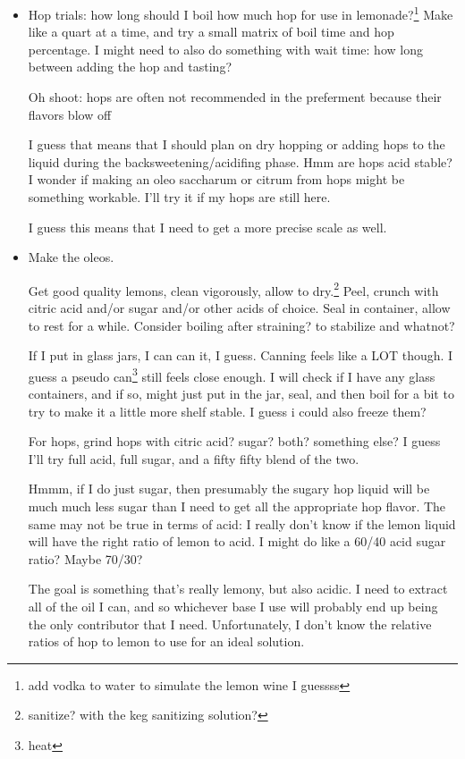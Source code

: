 \documentclass[12pt]{article}
\renewcommand{\,}{\textsuperscript{,}}
\begin{document}
\begin{itemize}

\item Hop trials: how long should I boil how much hop for use in lemonade?\footnote{add vodka to water to simulate the lemon wine I guessss}  
Make like a quart at a time, and try a small matrix of boil time and hop percentage.  
I might need to also do something with wait time: how long between adding the hop and tasting?

Oh shoot: hops are often not recommended in the preferment because their flavors blow off

I guess that means that I should plan on dry hopping or adding hops to the liquid during the backsweetening/acidifing phase.  
Hmm are hops acid stable?  
I wonder if making an oleo saccharum or citrum from hops might be something workable.  
I'll try it if my hops are still here.

I guess this means that I need to get a more precise scale as well.

\item Make the oleos.

Get good quality lemons, clean vigorously, allow to dry.\footnote{sanitize? with the keg sanitizing solution?}  
Peel, crunch with citric acid and/or sugar and/or other acids of choice.  
Seal in container, allow to rest for a while.  
Consider boiling after straining? to stabilize and whatnot?

If I put in glass jars, I can can it, I guess.  
Canning feels like a LOT though.  
I guess a pseudo can\footnote{heat} still feels close enough.  
I will check if I have any glass containers, and if so, might just put in the jar, seal, and then boil for a bit to try to make it a little more shelf stable.  
I guess i could also freeze them?

For hops, grind hops with citric acid? sugar? both? something else? I guess I'll try full acid, full sugar, and a fifty fifty blend of the two.

Hmmm, if I do just sugar, then presumably the sugary hop liquid will be much much less sugar than I need to get all the appropriate hop flavor.  
The same may not be true in terms of acid: I really don't know if the lemon liquid will have the right ratio of lemon to acid. I might do like a 60/40 acid sugar ratio?  
Maybe 70/30?

The goal is something that's really lemony, but also acidic.  
I need to extract all of the oil I can, and so whichever base I use will probably end up being the only contributor that I need.  
Unfortunately, I don't know the relative ratios of hop to lemon to use for an ideal solution.


\end{itemize}
\end{document}
